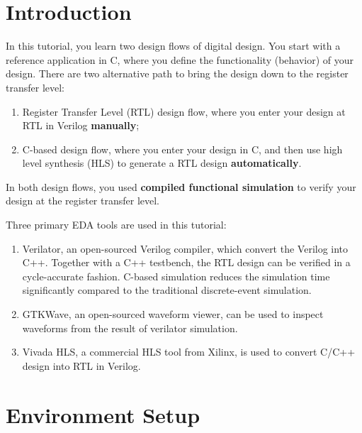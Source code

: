 \documentclass[12pt]{article}
\begin{document}
\pagebreak


\section{Introduction}

In this tutorial, you learn two design flows of digital design.  You
start with a reference application in C, where you define the
functionality (behavior) of your design. There are two alternative path
to bring the design down to the register transfer level: 

\begin{enumerate}
\item Register Transfer Level (RTL) design flow, where you enter your
  design at RTL in Verilog {\bf manually};
  
\item C-based design flow, where you enter your design in C, and then
  use high level synthesis (HLS) to generate a RTL design {\bf
    automatically}.
\end{enumerate}

In both design flows, you used {\bf compiled functional simulation} to
verify your design at the register transfer level.

Three primary EDA tools are used in this tutorial:

\begin{enumerate}
\item Verilator, an open-sourced Verilog compiler, which convert the
  Verilog into C++. Together with a C++ testbench, the RTL design can
  be verified in a cycle-accurate fashion.  C-based simulation reduces
  the simulation time significantly compared to the traditional
  discrete-event simulation.

\item GTKWave, an open-sourced waveform viewer, can be used to inspect
  waveforms from the result of verilator simulation.
  
\item Vivada HLS, a commercial HLS tool from Xilinx, is used to convert
  C/C++ design into RTL in Verilog.

\end{enumerate}


\section{Environment Setup}
\end{document}
